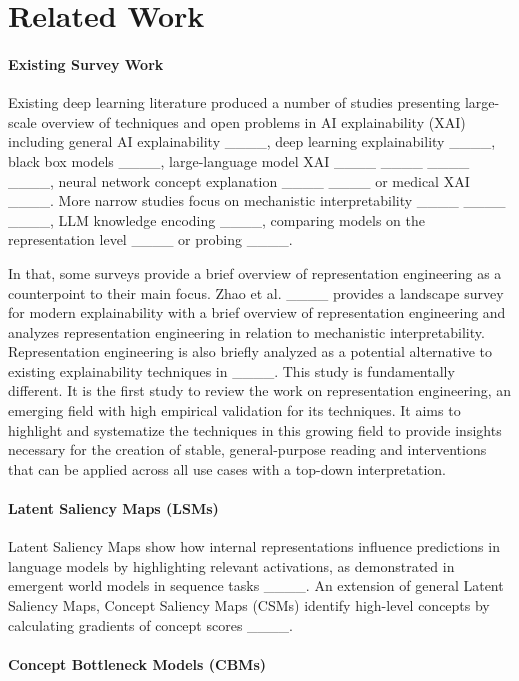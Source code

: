 \section{Related Work}
\paragraph{Existing Survey Work}

Existing deep learning literature produced a number of studies presenting large-scale overview of techniques and open problems in AI explainability (XAI) including general AI explainability ____, deep learning explainability ____, black box models  ____, large-language model XAI ____ ____ ____ ____, neural network concept explanation ____ ____ or medical XAI ____. More narrow studies focus on mechanistic interpretability ____ ____ ____, LLM knowledge encoding ____, comparing models on the representation level ____ or probing ____.

In that, some surveys provide a brief overview of representation engineering as a counterpoint to their main focus. Zhao et al. ____ provides a landscape survey for modern explainability with a brief overview of representation engineering and analyzes representation engineering in relation to mechanistic interpretability. Representation engineering is also briefly analyzed as a potential alternative to existing explainability techniques in ____. This study is fundamentally different. It is the first study to review the work on representation engineering, an emerging field with high empirical validation for its techniques. It aims to highlight and systematize the techniques in this growing field to provide insights necessary for the creation of stable, general-purpose reading and interventions that can be applied across all use cases with a top-down interpretation. 

\paragraph{Latent Saliency Maps (LSMs)}  

Latent Saliency Maps show how internal representations influence predictions in language models by highlighting relevant activations, as demonstrated in emergent world models in sequence tasks ____. An extension of general Latent Saliency Maps, Concept Saliency Maps (CSMs) identify high-level concepts by calculating gradients of concept scores ____. 

\paragraph{Concept Bottleneck Models (CBMs)} 

